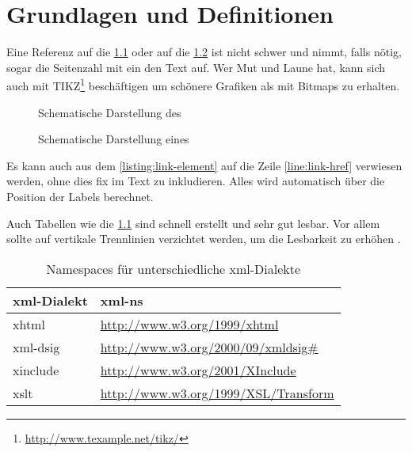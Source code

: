 
\chapter{Grundlagen und Definitionen}
\label{chap:GrundlagenDefinitionen}
\blindtext

Eine Referenz auf die \cref{fig:wot} oder auf die \cref{fig:ht} ist nicht schwer und nimmt, falls nötig, sogar die Seitenzahl mit ein den Text auf. Wer Mut und
Laune hat, kann sich auch mit TIKZ\footnote{\url{http://www.texample.net/tikz/}} beschäftigen um schönere Grafiken als mit Bitmaps zu erhalten.

\begin{figure}
\centering

\caption{Schematische Darstellung des }
\label{fig:wot}
\end{figure}


\begin{figure}
\centering
\begin{sideways}

\end{sideways}
\caption{Schematische Darstellung eines }
\label{fig:ht}
\end{figure}

Es kann auch aus dem \cref{listing:link-element} auf die Zeile \ref{line:link-href} verwiesen werden, ohne dies fix im Text zu inkludieren. Alles wird automatisch über die
Position der Labels berechnet.



Auch Tabellen wie die \cref{tab:xml-namespaces} sind schnell erstellt und sehr gut lesbar. Vor allem sollte auf vertikale Trennlinien verzichtet werden, um die
Lesbarkeit zu erhöhen \cite{latex}.

\begin{table}
    \centering
    \begin{tabularx}{\textwidth}{ l X }
        \gls{xml}-Dialekt  & \gls{xml-ns} \\
        \hline
        \hline
        \gls{xhtml} & \url{http://www.w3.org/1999/xhtml} \\
        \hline
        \gls{xml-dsig} & \url{http://www.w3.org/2000/09/xmldsig\#} \\
        \hline
        \gls{xinclude} & \url{http://www.w3.org/2001/XInclude} \\
        \hline
        \gls{xslt} & \url{http://www.w3.org/1999/XSL/Transform} \\
        \hline
    \end{tabularx}
    \caption{Namespaces für unterschiedliche \protect\gls{xml}-Dialekte}
    \label{tab:xml-namespaces}
\end{table}

